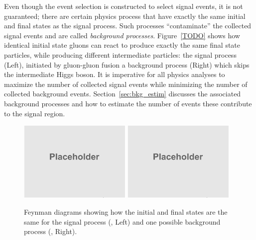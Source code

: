 Even though the event selection is constructed to select signal events, it is not guaranteed;
there are certain physics process that have exactly the same initial and final states as the signal process.
Such processes ``contaminate'' the collected signal events and are called \emph{background processes}.
Figure~\ref{TODO} shows how identical initial state gluons can react to produce exactly the same final state particles, while producing different intermediate particles:
the signal process (Left), initiated by gluon-gluon fusion \vs a background process (Right) which skips the intermediate Higgs boson.
It is imperative for all physics analyses to maximize the number of collected signal events while minimizing the number of collected background events.
Section~\ref{sec:bkg_estim} discusses the associated background processes and how to estimate the number of events these contribute to the signal region.
\begin{figure}[!htbp]
	\begin{center}
		\includegraphics[width=0.48\textwidth]{figures/placeholder.png}  %
		\includegraphics[width=0.48\textwidth]{figures/placeholder.png}  %
		\caption{
            Feynman diagrams showing how the initial and final states are the same
            for the signal process (\gghzzfourl, Left) and one possible background process (\ggzzfourl, Right).
        }
		\label{fig:feyndiag_sig_vs_bkg}
	\end{center}
\end{figure}


